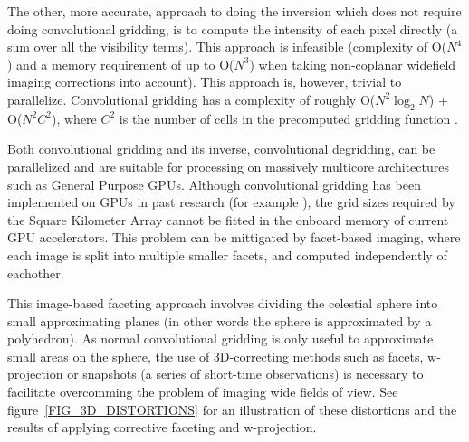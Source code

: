 \documentclass[a4paper, two column]{article}
\begin{document}
The other, more accurate, approach to doing the inversion which does not require doing convolutional gridding, is to compute the intensity of each pixel directly (a sum over all the visibility terms). This approach is infeasible
(complexity of O($N^4$) and a memory requirement of up to O($N^3$) when taking non-coplanar widefield imaging corrections into account). This approach is, however, trivial to parallelize. Convolutional gridding has
a complexity of roughly O($N^2\log_2{N}$) + O($N^2C^2$), where $C^2$ is the number of cells in the precomputed gridding function \cite[Lecture 7]{taylor1999synthesis}.

Both convolutional gridding and its inverse, convolutional degridding, can be parallelized and are suitable for processing on massively multicore architectures such as General Purpose GPUs. Although convolutional gridding 
has been implemented on GPUs in past research (for example \cite{romein2012efficient}), the grid sizes required by the Square Kilometer Array cannot be fitted in the onboard memory of current GPU accelerators. This problem 
can be mittigated by facet-based imaging, where each image is split into multiple smaller facets, and computed independently of eachother. 

This image-based faceting approach \cite{cornwell1992radio} involves dividing the celestial sphere into small approximating planes (in other words the sphere is approximated by a polyhedron). 
As normal convolutional gridding is only useful to approximate small areas on the sphere, the use of 3D-correcting methods such as facets, w-projection \cite{cornwell2005w} or snapshots (a series 
of short-time observations) is necessary to facilitate overcomming the problem of imaging wide fields of view. See figure~\ref{FIG_3D_DISTORTIONS} for an illustration of these distortions and the 
results of applying corrective faceting and w-projection. 
\end{document}
